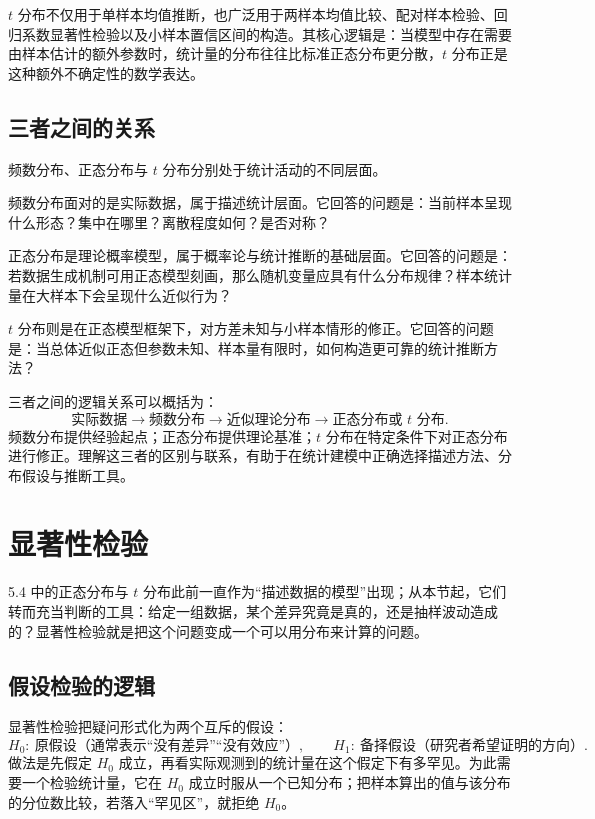 \documentclass[UTF8]{ctexbook}
\begin{document}
$t$ 分布不仅用于单样本均值推断，也广泛用于两样本均值比较、配对样本检验、回归系数显著性检验以及小样本置信区间的构造。其核心逻辑是：当模型中存在需要由样本估计的额外参数时，统计量的分布往往比标准正态分布更分散，$t$ 分布正是这种额外不确定性的数学表达。

\subsection{三者之间的关系}

频数分布、正态分布与 $t$ 分布分别处于统计活动的不同层面。

频数分布面对的是实际数据，属于描述统计层面。它回答的问题是：当前样本呈现什么形态？集中在哪里？离散程度如何？是否对称？

正态分布是理论概率模型，属于概率论与统计推断的基础层面。它回答的问题是：若数据生成机制可用正态模型刻画，那么随机变量应具有什么分布规律？样本统计量在大样本下会呈现什么近似行为？

$t$ 分布则是在正态模型框架下，对方差未知与小样本情形的修正。它回答的问题是：当总体近似正态但参数未知、样本量有限时，如何构造更可靠的统计推断方法？

三者之间的逻辑关系可以概括为：
\[
\text{实际数据}
\longrightarrow
\text{频数分布}
\longrightarrow
\text{近似理论分布}
\longrightarrow
\text{正态分布或 } t \text{ 分布}.
\]
频数分布提供经验起点；正态分布提供理论基准；$t$ 分布在特定条件下对正态分布进行修正。理解这三者的区别与联系，有助于在统计建模中正确选择描述方法、分布假设与推断工具。

\section{显著性检验}

5.4 中的正态分布与 $t$ 分布此前一直作为“描述数据的模型”出现；从本节起，它们转而充当判断的工具：给定一组数据，某个差异究竟是真的，还是抽样波动造成的？显著性检验就是把这个问题变成一个可以用分布来计算的问题。

\subsection{假设检验的逻辑}

显著性检验把疑问形式化为两个互斥的假设：
\[
H_0:\ \text{原假设（通常表示“没有差异”“没有效应”）},
\qquad
H_1:\ \text{备择假设（研究者希望证明的方向）}.
\]
做法是先假定 $H_0$ 成立，再看实际观测到的统计量在这个假定下有多罕见。为此需要一个检验统计量，它在 $H_0$ 成立时服从一个已知分布；把样本算出的值与该分布的分位数比较，若落入“罕见区”，就拒绝 $H_0$。
\end{document}
